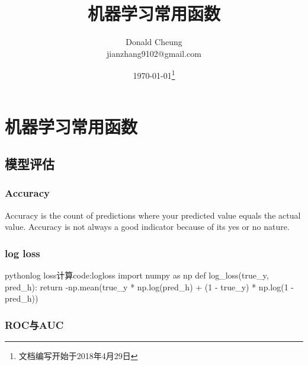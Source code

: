 \ifx\mlnotes\undefined
    \providecommand{\notesroot}{../..}
    \providecommand{\funcroot}{.}

    \title{机器学习常用函数}
    \author{Donald Cheung\\jianzhang9102@gmail.com}
    \date{\today\footnote{文档编写开始于2018年4月29日}}

    
\else
    \providecommand{\funcroot}{\mlroot/function}
\fi

\chapter{机器学习常用函数}

\section{模型评估}

\subsection{Accuracy}
Accuracy is the count of predictions where your predicted value equals the actual value.
Accuracy is not always a good indicator because of its yes or no nature.

\subsection{log loss}

\begin{jcode}{python}{log loss计算}{code:logloss}
import numpy as np
def log_loss(true_y, pred_h):
    return -np.mean(true_y * np.log(pred_h) + (1 - true_y) * np.log(1 - pred_h))
\end{jcode}

\subsection{ROC与AUC}

\ifx\mlnotes\undefined
    
\fi
